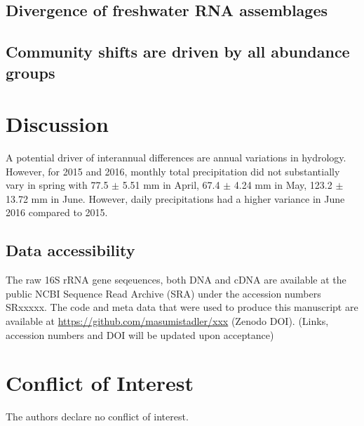 \documentclass[12pt,a4paper]{article} %
\begin{document}
\subsection*{Divergence of freshwater RNA assemblages}

\subsection*{Community shifts are driven by all abundance groups}


\section*{Discussion}

 A potential driver of interannual differences are annual variations in hydrology. However, for 2015 and 2016, monthly total precipitation did not substantially vary in spring with 77.5 $\pm$ 5.51 mm in April, 67.4 $\pm$ 4.24 mm in May, 123.2 $\pm$ 13.72 mm in June. However, daily precipitations had a higher variance in June 2016 compared to 2015.

\subsection*{Data accessibility}
The raw 16S rRNA gene seqeuences, both DNA and cDNA are available at the public NCBI Sequence Read Archive (SRA) under the accession numbers SRxxxxx. The code and meta data that were used to produce this manuscript are available at \url{https://github.com/masumistadler/xxx} (Zenodo DOI). (Links, accession numbers and DOI will be updated upon acceptance) \\

\section*{Conflict of Interest}
The authors declare no conflict of interest.
\end{document}
